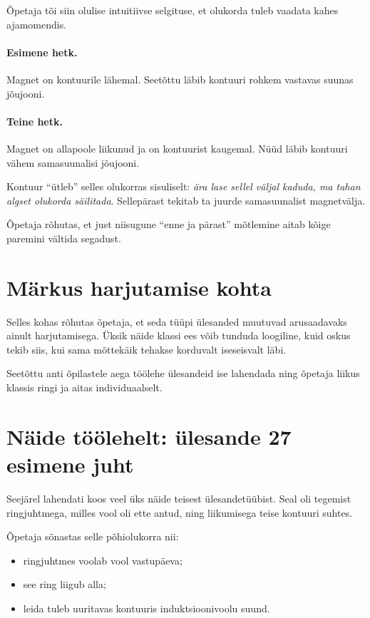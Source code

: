 \documentclass[a4paper,11pt]{article}
\begin{document}
Õpetaja tõi siin olulise intuitiivse selgituse, et olukorda tuleb vaadata kahes ajamomendis.

\paragraph{Esimene hetk.}
Magnet on kontuurile lähemal. Seetõttu läbib kontuuri rohkem vastavas suunas jõujooni.

\paragraph{Teine hetk.}
Magnet on allapoole liikunud ja on kontuurist kaugemal. Nüüd läbib kontuuri vähem samasuunalisi jõujooni.

Kontuur ``ütleb'' selles olukorras sisuliselt: \emph{ära lase sellel väljal kaduda, ma tahan algset olukorda säilitada}. Sellepärast tekitab ta juurde samasuunalist magnetvälja.

Õpetaja rõhutas, et just niisugune ``enne ja pärast'' mõtlemine aitab kõige paremini vältida segadust.

\section{Märkus harjutamise kohta}

Selles kohas rõhutas õpetaja, et seda tüüpi ülesanded muutuvad arusaadavaks ainult harjutamisega. Üksik näide klassi ees võib tunduda loogiline, kuid oskus tekib siis, kui sama mõttekäik tehakse korduvalt iseseisvalt läbi.

Seetõttu anti õpilastele aega töölehe ülesandeid ise lahendada ning õpetaja liikus klassis ringi ja aitas individuaalselt.

\section{Näide töölehelt: ülesande 27 esimene juht}

Seejärel lahendati koos veel üks näide teisest ülesandetüübist. Seal oli tegemist ringjuhtmega, milles vool oli ette antud, ning liikumisega teise kontuuri suhtes.

Õpetaja sõnastas selle põhiolukorra nii:

\begin{itemize}
    \item ringjuhtmes voolab vool vastupäeva;
    \item see ring liigub alla;
    \item leida tuleb uuritavas kontuuris induktsioonivoolu suund.
\end{itemize}
\end{document}
